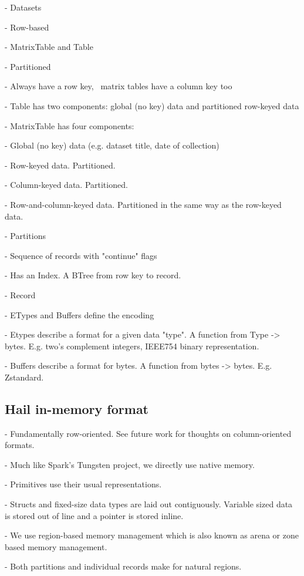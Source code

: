 \documentclass[10pt,a4paper%
]{article}
\begin{document}
    - Datasets

      - Row-based

      - MatrixTable and Table

      - Partitioned

      - Always have a row key,  matrix tables have a column key too

      - Table has two components: global (no key) data and partitioned row-keyed data

      - MatrixTable has four components:

        - Global (no key) data (e.g. dataset title, date of collection)

        - Row-keyed data. Partitioned.

        - Column-keyed data. Partitioned.

        - Row-and-column-keyed data. Partitioned in the same way as the row-keyed data.

    - Partitions

      - Sequence of records with "continue" flags

      - Has an Index. A BTree from row key to record.

    - Record

      - ETypes and Buffers define the encoding

        - Etypes describe a format for a given data "type". A function from Type -> bytes. E.g. two’s complement integers, IEEE754 binary representation.

        - Buffers describe a format for bytes. A function from bytes -> bytes. E.g. Zstandard.

\subsection{Hail in-memory format}

    - Fundamentally row-oriented. See future work for thoughts on column-oriented formats.

    - Much like Spark’s Tungsten project, we directly use native memory.

    - Primitives use their usual representations.

    - Structs and fixed-size data types are laid out contiguously. Variable sized data is stored out of line and a pointer is stored inline.

    - We use region-based memory management which is also known as arena or zone based memory management.

      - Both partitions and individual records make for natural regions.
\end{document}
